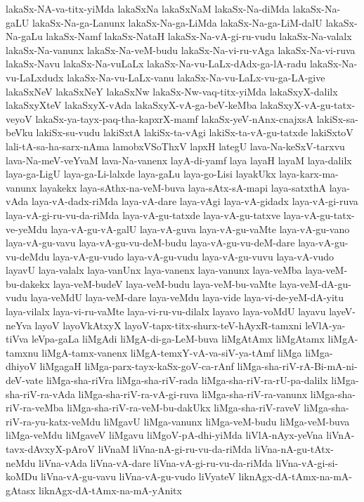 {lakaSx-NA-va-titx-yiMda
lakaSxNa
lakaSxNaM
lakaSx-Na-diMda
lakaSx-Na-gaLU
lakaSx-Na-ga-Lanunx
lakaSx-Na-ga-LiMda
lakaSx-Na-ga-LiM-dalU
lakaSx-Na-gaLu
lakaSx-Namf
lakaSx-NataH
lakaSx-Na-vA-gi-ru-vudu
lakaSx-Na-valalx
lakaSx-Na-vanunx
lakaSx-Na-veM-budu
lakaSx-Na-vi-ru-vAga
lakaSx-Na-vi-ruva
lakaSx-Navu
lakaSx-Na-vuLaLx
lakaSx-Na-vu-LaLx-dAdx-ga-lA-radu
lakaSx-Na-vu-LaLxdudx
lakaSx-Na-vu-LaLx-vanu
lakaSx-Na-vu-LaLx-vu-ga-LA-give
lakaSxNeV
lakaSxNeY
lakaSxNw
lakaSx-Nw-vaq-titx-yiMda
lakaSxyX-dalilx
lakaSxyXteV
lakaSxyX-vAda
lakaSxyX-vA-ga-beV-keMba
lakaSxyX-vA-gu-tatx-veyoV
lakaSx-ya-tayx-paq-tha-kapxrX-mamf
lakaSx-yeV-nAnx-cnajxsA
lakiSx-sa-beVku
lakiSx-su-vudu
lakiSxtA
lakiSx-ta-vAgi
lakiSx-ta-vA-gu-tatxde
lakiSxtoV
lali-tA-sa-ha-sarx-nAma
lamobxVSoThxV
lapxH
lategU
lava-Na-keSxV-tarxvu
lava-Na-meV-veYvaM
lava-Na-vanenx
layA-di-yamf
laya
layaH
layaM
laya-dalilx
laya-ga-LigU
laya-ga-Li-lalxde
laya-gaLu
laya-go-Lisi
layakUkx
laya-karx-ma-vanunx
layakekx
laya-sAthx-na-veM-buva
laya-sAtx-sA-mapi
laya-satxthA
laya-vAda
laya-vA-dadx-riMda
laya-vA-dare
laya-vAgi
laya-vA-gidadx
laya-vA-gi-ruva
laya-vA-gi-ru-vu-da-riMda
laya-vA-gu-tatxde
laya-vA-gu-tatxve
laya-vA-gu-tatx-ve-yeMdu
laya-vA-gu-vA-galU
laya-vA-guva
laya-vA-gu-vaMte
laya-vA-gu-vano
laya-vA-gu-vavu
laya-vA-gu-vu-deM-budu
laya-vA-gu-vu-deM-dare
laya-vA-gu-vu-deMdu
laya-vA-gu-vudo
laya-vA-gu-vudu
laya-vA-gu-vuvu
laya-vA-vudo
layavU
laya-valalx
laya-vanUnx
laya-vanenx
laya-vanunx
laya-veMba
laya-veM-bu-dakekx
laya-veM-budeV
laya-veM-budu
laya-veM-bu-vaMte
laya-veM-dA-gu-vudu
laya-veMdU
laya-veM-dare
laya-veMdu
laya-vide
laya-vi-de-yeM-dA-yitu
laya-vilalx
laya-vi-ru-vaMte
laya-vi-ru-vu-dilalx
layavo
laya-voMdU
layavu
layeV-neYva
layoV
layoVkAtxyX
layoV-tapx-titx-shurx-teV-hAyxR-tamxni
leVlA-ya-tiVva
leVpa-gaLa
liMgAdi
liMgA-di-ga-LeM-buva
liMgAtAmx
liMgAtamx
liMgA-tamxnu
liMgA-tamx-vanenx
liMgA-temxY-vA-va-siV-ya-tAmf
liMga
liMga-dhiyoV
liMgagaH
liMga-parx-tayx-kaSx-goV-ca-rAnf
liMga-sha-riV-rA-Bi-mA-ni-deV-vate
liMga-sha-riVra
liMga-sha-riV-rada
liMga-sha-riV-ra-rU-pa-dalilx
liMga-sha-riV-ra-vAda
liMga-sha-riV-ra-vA-gi-ruva
liMga-sha-riV-ra-vanunx
liMga-sha-riV-ra-veMba
liMga-sha-riV-ra-veM-bu-dakUkx
liMga-sha-riV-raveV
liMga-sha-riV-ra-yu-katx-veMdu
liMgavU
liMga-vanunx
liMga-veM-budu
liMga-veM-buva
liMga-veMdu
liMgaveV
liMgavu
liMgoV-pA-dhi-yiMda
liVlA-nAyx-yeVna
liVnA-tavx-dAvxyX-pAroV
liVnaM
liVna-nA-gi-ru-vu-da-riMda
liVna-nA-gu-tAtx-neMdu
liVna-vAda
liVna-vA-dare
liVna-vA-gi-ru-vu-da-riMda
liVna-vA-gi-si-koMDu
liVna-vA-gu-vavu
liVna-vA-gu-vudo
liVyateV
liknAgx-dA-tAmx-na-mA-gAtasx
liknAgx-dA-tAmx-na-mA-yAnitx
}
